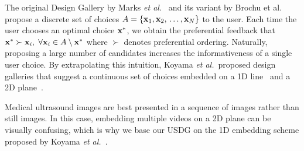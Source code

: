 The original Design Gallery by Marks \textit{et al.}~\cite{10.1145/258734.258887} and its variant by Brochu et al.~\cite{brochu_bayesian_2010} propose a discrete set of choices \(A = \{\mathbf{x}_1, \mathbf{x}_2,{\,\ldots\,}, \mathbf{x}_N\}\) to the user.
Each time the user chooses an optimal choice \(\mathbf{x}^*\), we obtain the preferential feedback that \(\mathbf{x}^* \succ \mathbf{x}_i,\; \forall\mathbf{x}_i \in A \setminus \mathbf{x}^* \) where \(\succ\) denotes preferential ordering.
Naturally, proposing a large number of candidates increases the informativeness of a single user choice.
By extrapolating this intuition, Koyama \textit{et al.}~proposed design galleries that suggest a continuous set of choices embedded on a 1D line~\cite{10.1145/3072959.3073598} and a 2D plane~\cite{koyama_sequential_2020}.

Medical ultrasound images are best presented in a sequence of images rather than still images.
In this case, embedding multiple videos on a 2D plane can be visually confusing, which is why we base our USDG on the 1D embedding scheme proposed by Koyama \textit{et al.}~\cite{10.1145/3072959.3073598}.

